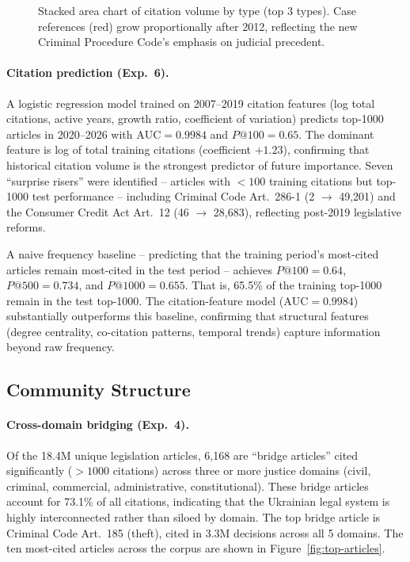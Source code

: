 \documentclass[11pt]{article}
\begin{document}
\begin{figure}[t]
\centering

\caption{Stacked area chart of citation volume by type (top 3 types). Case references (red) grow proportionally after 2012, reflecting the new Criminal Procedure Code's emphasis on judicial precedent.}
\label{fig:type-by-year}
\end{figure}

\paragraph{Citation prediction (Exp.~6).}
A logistic regression model trained on 2007--2019 citation features (log total citations, active years, growth ratio, coefficient of variation) predicts top-1000 articles in 2020--2026 with $\text{AUC} = 0.9984$ and $P@100 = 0.65$.
The dominant feature is log of total training citations (coefficient $+1.23$), confirming that historical citation volume is the strongest predictor of future importance.
Seven ``surprise risers'' were identified -- articles with $<100$ training citations but top-1000 test performance -- including Criminal Code Art.~286-1 (2 $\to$ 49,201) and the Consumer Credit Act Art.~12 (46 $\to$ 28,683), reflecting post-2019 legislative reforms.

A naive frequency baseline -- predicting that the training period's most-cited articles remain most-cited in the test period -- achieves $P@100 = 0.64$, $P@500 = 0.734$, and $P@1000 = 0.655$.
That is, 65.5\% of the training top-1000 remain in the test top-1000.
The citation-feature model ($\text{AUC} = 0.9984$) substantially outperforms this baseline, confirming that structural features (degree centrality, co-citation patterns, temporal trends) capture information beyond raw frequency.

\subsection{Community Structure}
\label{sec:community-results}

\paragraph{Cross-domain bridging (Exp.~4).}
Of the 18.4M unique legislation articles, 6,168 are ``bridge articles'' cited significantly ($>1000$ citations) across three or more justice domains (civil, criminal, commercial, administrative, constitutional).
These bridge articles account for 73.1\% of all citations, indicating that the Ukrainian legal system is highly interconnected rather than siloed by domain.
The top bridge article is Criminal Code Art.~185 (theft), cited in 3.3M decisions across all 5 domains.
The ten most-cited articles across the corpus are shown in Figure~\ref{fig:top-articles}.
\end{document}
